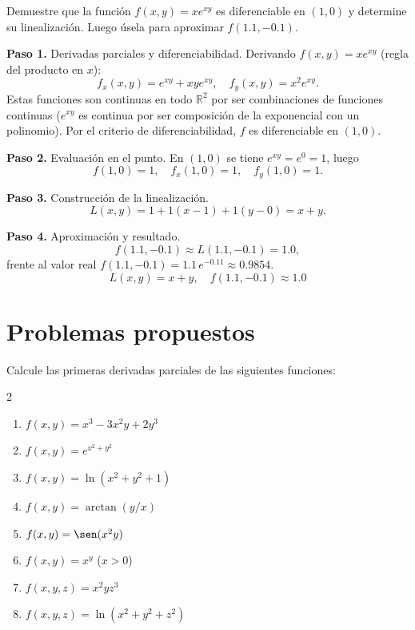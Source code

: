 \begin{example}[Diferenciabilidad de $xe^{xy}$]
Demuestre que la función $f(x, y) = x e^{xy}$ es diferenciable en $(1, 0)$ y determine su linealización. Luego úsela para aproximar $f(1.1, -0.1)$.
\begin{myproof}
\textbf{Paso 1.} Derivadas parciales y diferenciabilidad. Derivando
$f(x,y)=xe^{xy}$ (regla del producto en $x$):
\[
f_x(x, y) = e^{xy} + xy e^{xy}, \quad f_y(x, y) = x^2 e^{xy}.
\]
Estas funciones son continuas en todo $\mathbb{R}^2$ por ser combinaciones de funciones continuas ($e^{xy}$ es continua por ser composición de la exponencial con un polinomio). Por el criterio de diferenciabilidad, $f$ es diferenciable en $(1, 0)$.

\textbf{Paso 2.} Evaluación en el punto. En $(1,0)$ se tiene $e^{xy}=e^0=1$, luego
\[
f(1, 0) = 1,\quad f_x(1, 0) = 1,\quad f_y(1, 0) = 1.
\]

\textbf{Paso 3.} Construcción de la linealización.
\[
L(x, y) = 1 + 1(x - 1) + 1(y - 0) = x + y.
\]

\textbf{Paso 4.} Aproximación y resultado.
\[
f(1.1, -0.1) \approx L(1.1, -0.1) = 1.0,
\]
frente al valor real $f(1.1,-0.1)=1.1\,e^{-0.11}\approx 0.9854$.
\[
\boxed{L(x, y) = x + y,\quad f(1.1, -0.1) \approx 1.0}
\]
\end{myproof}
\end{example}


\section{Problemas propuestos}

\begin{prob}
Calcule las primeras derivadas parciales de las siguientes funciones:
\begin{multicols}{2}
\begin{enumerate}
    \item $f(x,y)=x^3-3x^2 y+2y^3$
    \item $f(x,y)=e^{x^2+y^2}$
    \item $f(x,y)=\ln(x^2+y^2+1)$
    \item $f(x,y)=\arctan(y/x)$
    \item $f(x,y)=\sen(x^2 y)$
    \item $f(x,y)=x^y$ ($x>0$)
    \item $f(x,y,z)=x^2 y z^3$
    \item $f(x,y,z)=\ln(x^2+y^2+z^2)$
\end{enumerate}
\end{multicols}
\end{prob}


